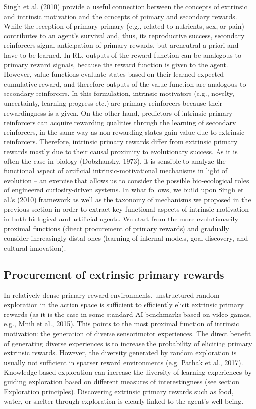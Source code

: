 Singh et al. (2010) provide a useful connection between the concepts of extrinsic and intrinsic motivation and the concepts of primary and secondary rewards. While the reception of primary primary (e.g., related to nutrients, sex, or pain) contributes to an agent’s survival and, thus, its reproductive success, secondary reinforcers signal anticipation of primary rewards, but areneutral a priori and have to be learned. In \ac{RL}, outputs of the reward function can be analogous to primary reward signals, because the reward function is given to the agent. However, value functions evaluate states based on their learned expected cumulative reward, and therefore outputs of the value function are analogous to secondary reinforcers. In this formulation, intrinsic motivators (e.g., novelty, uncertainty, learning progress etc.) are primary reinforcers because their rewardingness is a given. On the other hand, predictors of intrinsic primary reinforcers can acquire rewarding qualities through the learning of secondary reinforcers, in the same way as non-rewarding states gain value due to extrinsic reinforcers. Therefore, intrinsic primary rewards differ from extrinsic primary rewards mostly due to their causal proximity to evolutionary success. As it is often the case in biology (Dobzhansky, 1973), it is sensible to analyze the functional aspect of artificial intrinsic-motivational mechanisms in light of evolution -- an exercise that allows us to consider the possible bio-ecological roles of engineered curiosity-driven systems.
In what follows, we build upon Singh et al.’s (2010) framework as well as the taxonomy of mechanisms we proposed in the previous section in order to extract key functional aspects of intrinsic motivation in both biological and artificial agents. We start from the more evolutionarily proximal functions (direct procurement of primary rewards) and gradually consider increasingly distal ones (learning of internal models, goal discovery, and cultural innovation).

\subsection{Procurement of extrinsic primary rewards}
In relatively dense primary-reward environments, unstructured random exploration in the action space is sufficient to efficiently elicit extrinsic primary rewards (as it is the case in some standard \ac{AI} benchmarks based on video games, e.g., Mnih et al., 2015). This points to the most proximal function of intrinsic motivation: the generation of diverse sensorimotor experiences. The direct benefit of generating diverse experiences is to increase the probability of eliciting primary extrinsic rewards. However, the diversity generated by random exploration is usually not sufficient in sparser reward environments (e.g. Pathak et al., 2017). Knowledge-based exploration can increase the diversity of learning experiences by guiding exploration based on different measures of interestingness (see section Exploration principles). Discovering extrinsic primary rewards such as food, water, or shelter through exploration is clearly linked to the agent’s well-being.

